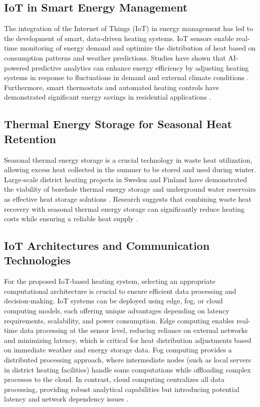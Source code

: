 \documentclass{article}
\begin{document}
\subsection{IoT in Smart Energy Management}
The integration of the Internet of Things (IoT) in energy management has led to the development of smart, data-driven heating systems. IoT sensors enable real-time monitoring of energy demand and optimize the distribution of heat based on consumption patterns and weather predictions. Studies have shown that AI-powered predictive analytics can enhance energy efficiency by adjusting heating systems in response to fluctuations in demand and external climate conditions \cite{ai_energy}. Furthermore, smart thermostats and automated heating controls have demonstrated significant energy savings in residential applications \cite{smart_heating}.

\subsection{Thermal Energy Storage for Seasonal Heat Retention}
Seasonal thermal energy storage is a crucial technology in waste heat utilization, allowing excess heat collected in the summer to be stored and used during winter. Large-scale district heating projects in Sweden and Finland have demonstrated the viability of borehole thermal energy storage and underground water reservoirs as effective heat storage solutions \cite{stockholm_heat}. Research suggests that combining waste heat recovery with seasonal thermal energy storage can significantly reduce heating costs while ensuring a reliable heat supply \cite{tes_review}.

\subsection{IoT Architectures and Communication Technologies}

For the proposed IoT-based heating system, selecting an appropriate computational architecture is crucial to ensure efficient data processing and decision-making. IoT systems can be deployed using edge, fog, or cloud computing models, each offering unique advantages depending on latency requirements, scalability, and power consumption. Edge computing enables real-time data processing at the sensor level, reducing reliance on external networks and minimizing latency, which is critical for heat distribution adjustments based on immediate weather and energy storage data. Fog computing provides a distributed processing approach, where intermediate nodes (such as local servers in district heating facilities) handle some computations while offloading complex processes to the cloud. In contrast, cloud computing centralizes all data processing, providing robust analytical capabilities but introducing potential latency and network dependency issues \cite{iot_architecture}. 
\end{document}
